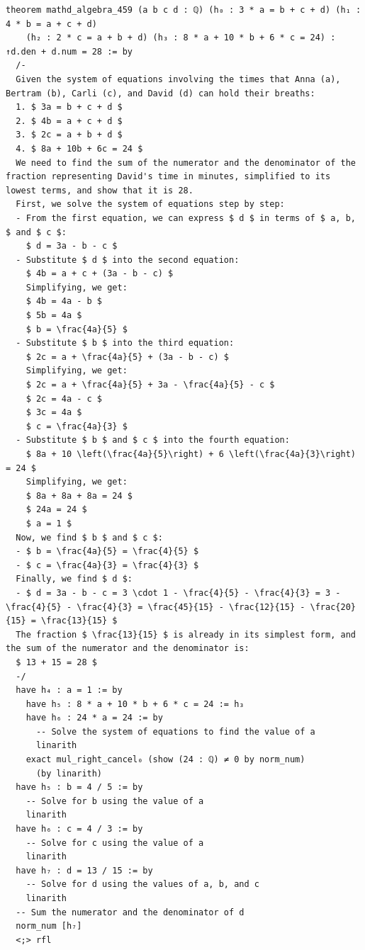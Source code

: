 \begin{lstlisting}[frame=single]
theorem mathd_algebra_459 (a b c d : ℚ) (h₀ : 3 * a = b + c + d) (h₁ : 4 * b = a + c + d)
    (h₂ : 2 * c = a + b + d) (h₃ : 8 * a + 10 * b + 6 * c = 24) : ↑d.den + d.num = 28 := by
  /-
  Given the system of equations involving the times that Anna (a), Bertram (b), Carli (c), and David (d) can hold their breaths:
  1. $ 3a = b + c + d $
  2. $ 4b = a + c + d $
  3. $ 2c = a + b + d $
  4. $ 8a + 10b + 6c = 24 $
  We need to find the sum of the numerator and the denominator of the fraction representing David's time in minutes, simplified to its lowest terms, and show that it is 28.
  First, we solve the system of equations step by step:
  - From the first equation, we can express $ d $ in terms of $ a, b, $ and $ c $:
    $ d = 3a - b - c $
  - Substitute $ d $ into the second equation:
    $ 4b = a + c + (3a - b - c) $
    Simplifying, we get:
    $ 4b = 4a - b $
    $ 5b = 4a $
    $ b = \frac{4a}{5} $
  - Substitute $ b $ into the third equation:
    $ 2c = a + \frac{4a}{5} + (3a - b - c) $
    Simplifying, we get:
    $ 2c = a + \frac{4a}{5} + 3a - \frac{4a}{5} - c $
    $ 2c = 4a - c $
    $ 3c = 4a $
    $ c = \frac{4a}{3} $
  - Substitute $ b $ and $ c $ into the fourth equation:
    $ 8a + 10 \left(\frac{4a}{5}\right) + 6 \left(\frac{4a}{3}\right) = 24 $
    Simplifying, we get:
    $ 8a + 8a + 8a = 24 $
    $ 24a = 24 $
    $ a = 1 $
  Now, we find $ b $ and $ c $:
  - $ b = \frac{4a}{5} = \frac{4}{5} $
  - $ c = \frac{4a}{3} = \frac{4}{3} $
  Finally, we find $ d $:
  - $ d = 3a - b - c = 3 \cdot 1 - \frac{4}{5} - \frac{4}{3} = 3 - \frac{4}{5} - \frac{4}{3} = \frac{45}{15} - \frac{12}{15} - \frac{20}{15} = \frac{13}{15} $
  The fraction $ \frac{13}{15} $ is already in its simplest form, and the sum of the numerator and the denominator is:
  $ 13 + 15 = 28 $
  -/
  have h₄ : a = 1 := by
    have h₅ : 8 * a + 10 * b + 6 * c = 24 := h₃
    have h₆ : 24 * a = 24 := by
      -- Solve the system of equations to find the value of a
      linarith
    exact mul_right_cancel₀ (show (24 : ℚ) ≠ 0 by norm_num) 
      (by linarith)
  have h₅ : b = 4 / 5 := by
    -- Solve for b using the value of a
    linarith
  have h₆ : c = 4 / 3 := by
    -- Solve for c using the value of a
    linarith
  have h₇ : d = 13 / 15 := by
    -- Solve for d using the values of a, b, and c
    linarith
  -- Sum the numerator and the denominator of d
  norm_num [h₇]
  <;> rfl
\end{lstlisting}

